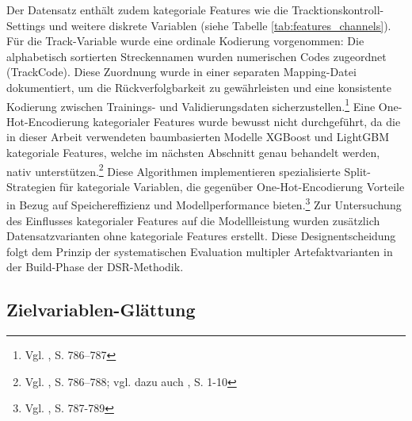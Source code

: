 Der Datensatz enthält zudem kategoriale Features wie die Tracktionskontroll-Settings und weitere diskrete Variablen (siehe Tabelle \ref{tab:features_channels}). Für die Track-Variable wurde eine ordinale Kodierung vorgenommen: Die alphabetisch sortierten Streckennamen wurden numerischen Codes zugeordnet (TrackCode). Diese Zuordnung wurde in einer separaten Mapping-Datei dokumentiert, um die Rückverfolgbarkeit zu gewährleisten und eine konsistente Kodierung zwischen Trainings- und Validierungsdaten sicherzustellen.\footnote{Vgl. \cite{Chen2016}, S. 786–787}
Eine One-Hot-Encodierung kategorialer Features wurde bewusst nicht durchgeführt, da die in dieser Arbeit verwendeten baumbasierten Modelle XGBoost und LightGBM kategoriale Features, welche im nächsten Abschnitt genau behandelt werden, nativ unterstützen.\footnote{Vgl. \cite{Chen2016}, S. 786–788; vgl. dazu auch \cite{Ke2017}, S. 1-10} Diese Algorithmen implementieren spezialisierte Split-Strategien für kategoriale Variablen, die gegenüber One-Hot-Encodierung Vorteile in Bezug auf Speichereffizienz und Modellperformance bieten.\footnote{Vgl. \cite{Chen2016}, S. 787-789}
Zur Untersuchung des Einflusses kategorialer Features auf die Modellleistung wurden zusätzlich Datensatzvarianten ohne kategoriale Features erstellt. Diese Designentscheidung folgt dem Prinzip der systematischen Evaluation multipler Artefaktvarianten in der Build-Phase der DSR-Methodik.


\subsection{Zielvariablen-Glättung}

